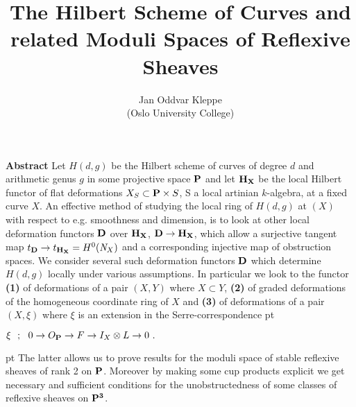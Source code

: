 \documentclass[12pt]{jarticle}
\title{The Hilbert Scheme of Curves and 
related Moduli Spaces of Reflexive Sheaves}
\author{ Jan Oddvar Kleppe \\ (Oslo University College)}
\date{}
\begin{document}
\maketitle
\thispagestyle{empty}

{\bf Abstract} Let $H(d,g)$ be the Hilbert scheme of curves of degree $d$ and
arithmetic genus $g$ in some projective space $\bf P$ and let $\bf H_X$ be the
local Hilbert functor of flat deformations $X_S \subset {\bf P} \times S$, S a
local artinian $k$-algebra, at a fixed curve $X$. An effective method of
studying the local ring of $H(d,g)$ at $(X)$ with respect to e.g. smoothness
and dimension, is to look at other local deformation functors $\bf D$ over
$\bf H_X$, $\bf D \rightarrow \bf H_X$, which allow a surjective tangent map
$t_{\bf D} \rightarrow t_{\bf H_X} = H^0({\it N}_X)$ and a corresponding
injective map of obstruction spaces. We consider several such deformation
functors $\bf D$ which determine $H(d,g)$ locally under various assumptions.
In particular we look to the functor {\bf (1)} of deformations of a pair
$(X,Y)$ where $X \subset Y$, {\bf (2)} of graded deformations of the
homogeneous coordinate ring of $X$ and {\bf (3)} of deformations of a pair
$(X,\xi)$ where $\xi$ is an extension in the Serre-correspondence  pt
\centerline {$ \xi \ \ ; \ \ 0 \rightarrow O_{\bf P} \rightarrow F \rightarrow
I_X \otimes L \rightarrow 0 \ .$}  pt The latter allows us to prove
results for the moduli space of stable reflexive sheaves of rank 2 on ${\bf
P}$. Moreover by making some cup products explicit we get necessary and
sufficient conditions for the unobstructedness of some classes of reflexive
sheaves on ${\bf P^3}$.
\end{document}
